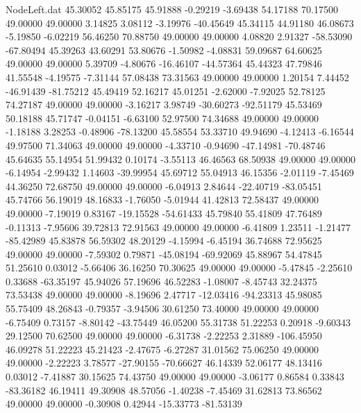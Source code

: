 \begin{filecontents}{NodeLeft.dat}
  45.30052   45.85175   45.91888    -0.29219   -3.69438   54.17188   70.17500   49.00000   49.00000    3.14825    3.08112   -3.19976  -40.45649
  45.34115   44.91180   46.08673    -5.19850   -6.02219   56.46250   70.88750   49.00000   49.00000    4.08820    2.91327  -58.53090  -67.80494
  45.39263   43.60291   53.80676    -1.50982   -4.08831   59.09687   64.60625   49.00000   49.00000    5.39709   -4.80676  -16.46107  -44.57364
  45.44323   47.79846   41.55548    -4.19575   -7.31144   57.08438   73.31563   49.00000   49.00000    1.20154    7.44452  -46.91439  -81.75212
  45.49419   52.16217   45.01251    -2.62000   -7.92025   52.78125   74.27187   49.00000   49.00000   -3.16217    3.98749  -30.60273  -92.51179
  45.53469   50.18188   45.71747    -0.04151   -6.63100   52.97500   74.34688   49.00000   49.00000   -1.18188    3.28253   -0.48906  -78.13200
  45.58554   53.33710   49.94690    -4.12413   -6.16544   49.97500   71.34063   49.00000   49.00000   -4.33710   -0.94690  -47.14981  -70.48746
  45.64635   55.14954   51.99432     0.10174   -3.55113   46.46563   68.50938   49.00000   49.00000   -6.14954   -2.99432    1.14603  -39.99954
  45.69712   55.04913   46.15356    -2.01119   -7.45469   44.36250   72.68750   49.00000   49.00000   -6.04913    2.84644  -22.40719  -83.05451
  45.74766   56.19019   48.16833    -1.76050   -5.01944   41.42813   72.58437   49.00000   49.00000   -7.19019    0.83167  -19.15528  -54.61433
  45.79840   55.41809   47.76489    -0.11313   -7.95606   39.72813   72.91563   49.00000   49.00000   -6.41809    1.23511   -1.21477  -85.42989
  45.83878   56.59302   48.20129    -4.15994   -6.45194   36.74688   72.95625   49.00000   49.00000   -7.59302    0.79871  -45.08194  -69.92069
  45.88967   54.47845   51.25610     0.03012   -5.66406   36.16250   70.30625   49.00000   49.00000   -5.47845   -2.25610    0.33688  -63.35197
  45.94026   57.19696   46.52283    -1.08007   -8.45743   32.24375   73.53438   49.00000   49.00000   -8.19696    2.47717  -12.03416  -94.23313
  45.98085   55.75409   48.26843    -0.79357   -3.94506   30.61250   73.40000   49.00000   49.00000   -6.75409    0.73157   -8.80142  -43.75449
  46.05200   55.31738   51.22253     0.20918   -9.60343   29.12500   70.62500   49.00000   49.00000   -6.31738   -2.22253    2.31889 -106.45950
  46.09278   51.22223   45.21423    -2.47675   -6.27287   31.01562   75.06250   49.00000   49.00000   -2.22223    3.78577  -27.90155  -70.66627
  46.14339   52.06177   48.13416     0.03012   -7.41887   30.15625   74.43750   49.00000   49.00000   -3.06177    0.86584    0.33843  -83.36182
  46.19411   49.30908   48.57056    -1.40238   -7.45469   31.62813   73.86562   49.00000   49.00000   -0.30908    0.42944  -15.33773  -81.53139

\end{filecontents}
